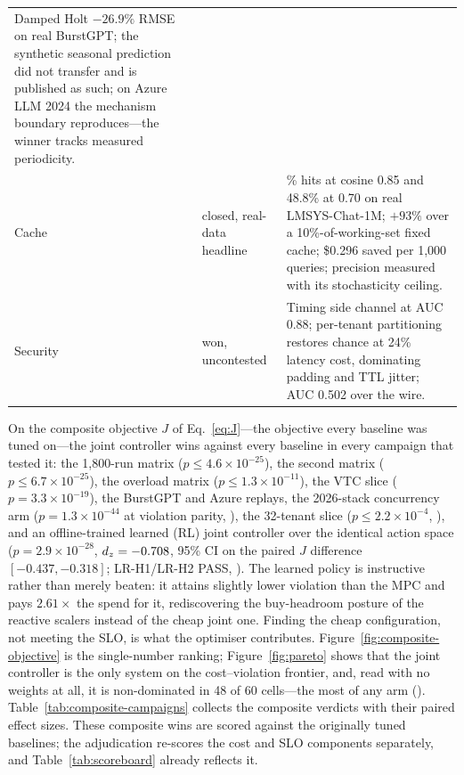\begin{longtable}{@{}>{\raggedright\arraybackslash}p{}>{\raggedright\arraybackslash}p{}>{\raggedright\arraybackslash}p{}@{}}
Damped Holt $-26.9\%$ RMSE on real BurstGPT; the synthetic seasonal
prediction did not transfer and is published as such; on Azure LLM 2024
the mechanism boundary reproduces---the winner tracks measured periodicity. \\
Cache & closed, real-data headline &
29.6\% hits at cosine 0.85 and 48.8\% at 0.70 on real LMSYS-Chat-1M;
$+93\%$ over a 10\%-of-working-set fixed cache; \$0.296 saved per 1,000
queries; precision measured with its stochasticity ceiling. \\
Security & won, uncontested &
Timing side channel at AUC 0.88; per-tenant partitioning restores chance
at 24\% latency cost, dominating padding and TTL jitter; AUC 0.502 over
the wire. \\
\bottomrule
\end{longtable}
\endgroup

On the composite objective $J$ of Eq.~\eqref{eq:J}---the objective every
baseline was tuned on---the joint controller wins against every baseline
in every campaign that tested it: the 1,800-run matrix ($p \le
4.6{\times}10^{-25}$), the second matrix ($p \le 6.7{\times}10^{-25}$), the
overload matrix ($p \le 1.3{\times}10^{-11}$), the VTC slice ($p =
3.3{\times}10^{-19}$), the BurstGPT and Azure replays, the 2026-stack
concurrency arm ($p = 1.3{\times}10^{-44}$ at violation parity,
), the 32-tenant slice ($p \le
2.2{\times}10^{-4}$, ), and an
offline-trained learned (RL) joint controller over the identical action
space ($p = 2.9{\times}10^{-28}$, $d_z = -0.708$, 95\% CI on the paired $J$
difference $[-0.437, -0.318]$; LR-H1/LR-H2 PASS,
). The learned policy is instructive rather
than merely beaten: it attains slightly lower violation than the MPC and
pays $2.61\times$ the spend for it, rediscovering the buy-headroom posture
of the reactive scalers instead of the cheap joint one. Finding the cheap
configuration, not meeting the SLO, is what the optimiser contributes.
Figure~\ref{fig:composite-objective} is the single-number ranking;
Figure~\ref{fig:pareto} shows that the joint controller is the only system
on the cost--violation frontier, and, read with no weights at all, it is
non-dominated in 48 of 60 cells---the most of any arm
(). Table~\ref{tab:composite-campaigns}
collects the composite verdicts with their paired effect sizes. These
composite wins are scored against the originally tuned baselines; the
adjudication re-scores the cost and SLO components separately, and
Table~\ref{tab:scoreboard} already reflects it.

